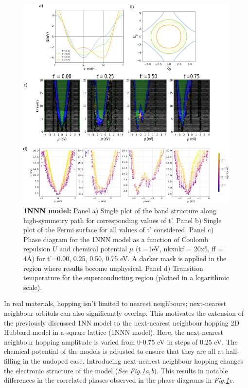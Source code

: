 \documentclass[12pt]{article}
\begin{document}
\begin{figure}[htbp]  %
    \centering
    \includegraphics[width=1.0\textwidth]{1NNN.png}  %
    \caption{\textbf{1NNN model:} Panel a) Single plot of the band structure along high-symmetry path for corresponding values of t'.
    Panel b) Single plot of the Fermi surface for all values of t' considered.
    Panel c) Phase diagram for the 1NNN model as a function of Coulomb repulsion $U$ and chemical potential $\mu$ (t =1eV, nkxnkf = 20x5, ff = 4\AA) for t'=0.00, 0.25, 0.50, 0.75 eV. 
    A darker mask is applied in the region where results become unphysical.
    Panel d) Transition temperature for the superconducting region (plotted in a logarithmic scale).
   }
    
    \label{fig:1NNN}
\end{figure}

In real materials, hopping isn't limited to nearest neighbours; next-nearest neighbour orbitals can also significantly overlap. This motivates the extension of the previously
discussed 1NN model to the next-nearest neighbour hopping 2D Hubbard model in a square lattice (1NNN model). 
Here, the next-nearest neighbour hopping amplitude is varied from 0-0.75 eV in steps of 0.25 eV.
The chemical potential of the models is adjusted to ensure that they are all
at half-filling in the undoped case. Introducing next-nearest neighbour hopping 
changes the electronic structure of the model (\textit{See Fig.\ref{fig:1NNN}a,b}). This results in notable
differences in the correlated phases observed in the phase diagrams in \textit{Fig.\ref{fig:1NNN}c}.\par
\medskip
\end{document}
